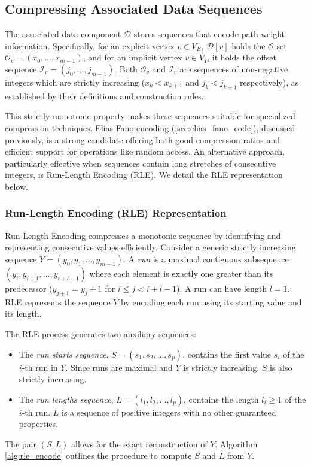 \subsection{Compressing Associated Data Sequences}
\label{subsec:compressing_associated_data_sequences}

The associated data component $\mathcal{D}$ stores sequences that encode path weight information. Specifically, for an explicit vertex $v \in V_E$, $\mathcal{D}[v]$ holds the $\mathcal{O}$-set $\mathcal{O}_v = (x_0, \dots, x_{m-1})$, and for an implicit vertex $v \in V_I$, it holds the offset sequence $\mathcal{I}_v = (j_0, \dots, j_{m-1})$. Both $\mathcal{O}_v$ and $\mathcal{I}_v$ are sequences of non-negative integers which are strictly increasing ($x_k < x_{k+1}$ and $j_k < j_{k+1}$ respectively), as established by their definitions and construction rules.

This strictly monotonic property makes these sequences suitable for specialized compression techniques. Elias-Fano encoding (\autoref{sec:elias_fano_code}), discussed previously, is a strong candidate offering both good compression ratios and efficient support for operations like random access. An alternative approach, particularly effective when sequences contain long stretches of consecutive integers, is Run-Length Encoding (RLE). We detail the RLE representation below.

\subsubsection*{Run-Length Encoding (RLE) Representation}
Run-Length Encoding compresses a monotonic sequence by identifying and representing consecutive values efficiently. Consider a generic strictly increasing sequence $Y = (y_0, y_1, \dots, y_{m-1})$. A \emph{run} is a maximal contiguous subsequence $(y_i, y_{i+1}, \dots, y_{i+l-1})$ where each element is exactly one greater than its predecessor ($y_{j+1} = y_j + 1$ for $i \le j < i+l-1$). A run can have length $l=1$. RLE represents the sequence $Y$ by encoding each run using its starting value and its length.

The RLE process generates two auxiliary sequences:
\begin{itemize}
    \item The \emph{run starts sequence}, $S = (s_1, s_2, \dots, s_p)$, contains the first value $s_i$ of the $i$-th run in $Y$. Since runs are maximal and $Y$ is strictly increasing, $S$ is also strictly increasing.
    \item The \emph{run lengths sequence}, $L = (l_1, l_2, \dots, l_p)$, contains the length $l_i \ge 1$ of the $i$-th run. $L$ is a sequence of positive integers with no other guaranteed properties.
\end{itemize}
The pair $(S, L)$ allows for the exact reconstruction of $Y$. Algorithm \ref{alg:rle_encode} outlines the procedure to compute $S$ and $L$ from $Y$.

